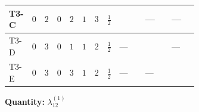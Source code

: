 \documentclass[8pt]{article}
\begin{document}
\begin{landscape}
\begin{longtable}{@{}llcccccc >{\raggedright\arraybackslash}p{0.21\linewidth} >{\raggedright\arraybackslash}p{0.21\linewidth} >{\raggedright\arraybackslash}p{0.21\linewidth}@{}}
\midrule
T3-C & $0$ & $2$ & $0$ & $2$ & $1$ & $3$ & $\frac{1}{2}$ & \scriptsize\adjustbox{max width=\linewidth}{$\begin{gathered} +\frac{3 {\lambda_{12}^{(A)}}^2}{4}\end{gathered}$} & --- & --- \\
\midrule
T3-D & $0$ & $3$ & $0$ & $1$ & $1$ & $2$ & $\frac{1}{2}$ & --- & \scriptsize\adjustbox{max width=\linewidth}{$\begin{gathered} +4 {\lambda_{12}^{(1)}} {\lambda_{S_1}^{(A)}}\end{gathered}$} & --- \\
\midrule
T3-E & $0$ & $3$ & $0$ & $3$ & $1$ & $2$ & $\frac{1}{2}$ & --- & --- & \scriptsize\adjustbox{max width=\linewidth}{$\begin{gathered} \frac{4}{3} {\lambda_5} \left({\lambda_5}\right)^{*}\end{gathered}$} \\
\midrule
\bottomrule
\end{longtable}
\clearpage
\noindent\textbf{Quantity: }$\lambda_{12}^{(1)}$\par\smallskip

\end{landscape}
\end{document}
